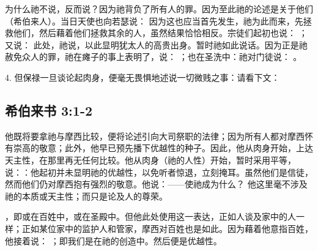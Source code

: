 为什么祂不说，反而说？因为祂背负了所有人的罪。因为至此祂的论述是关于他们（希伯来人）。当日天使也向若瑟说：  因为这也应当首先发生，祂为此而来，先拯救他们，然后藉着他们拯救其余的人，虽然结果恰恰相反。宗徒们起初也说： ；又说：  此处，祂说，以此显明犹太人的高贵出身。暂时祂如此说话。因为正是祂赦免众人的罪，祂在瘫子的事上表明了，说： ；也在圣洗中：祂对门徒说： 。\par

4. 但保禄一旦谈论起肉身，便毫无畏惧地述说一切微贱之事：请看下文：\par


\subsection{希伯来书 3:1-2}

\par

他既将要拿祂与摩西比较，便将论述引向大司祭职的法律；因为所有人都对摩西怀有崇高的敬意；此外，他早已预先播下优越性的种子。因此，他从肉身开始，上达天主性，在那里再无任何比较。他从肉身（祂的人性）开始，暂时采用平等，说：：他起初并未显明祂的优越性，以免听者惊退，立刻掩耳。虽然他们是信徒，然而他们仍对摩西抱有强烈的敬意。他说：——使祂成为什么？ 他这里毫不涉及祂的本质或天主性；而只是论及人的尊荣。\par

，即或在百姓中，或在圣殿中。但他此处使用这一表达，正如人谈及家中的人一样；正如某位家中的监护人和管家，摩西对百姓也是如此。因为藉着他意指百姓，他接着说： ；即我们是在祂的创造中。然后便是优越性。\par


